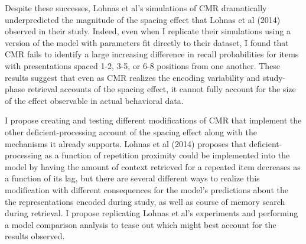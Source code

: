Despite these successes, Lohnas et al’s simulations of CMR dramatically underpredicted the magnitude of the spacing effect that Lohnas et al (2014) observed in their study. Indeed, even when I replicate their simulations using a version of the model with parameters fit directly to their dataset, I found that CMR fails to identify a large increasing difference in recall probabilities for items with presentations spaced 1-2, 3-5, or 6-8 positions from one another. These results suggest that even as CMR realizes the encoding variability and study-phase retrieval accounts of the spacing effect, it cannot fully account for the size of the effect observable in actual behavioral data.

I propose creating and testing different modifications of CMR that implement the other deficient-processing account of the spacing effect along with the mechanisms it already supports. Lohnas et al (2014) proposes that deficient-processing as a function of repetition proximity could be implemented into the model by having the amount of context retrieved for a repeated item decreases as a function of its lag, but there are several different ways to realize this modification with different consequences for the model’s predictions about the the representations encoded during study, as well as course of memory search during retrieval. I propose replicating Lohnas et al’s experiments and performing a model comparison analysis to tease out which might best account for the results observed.
